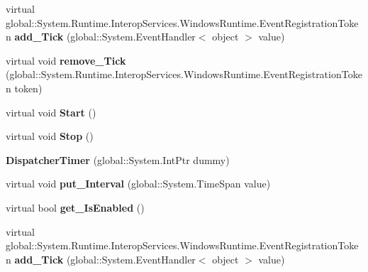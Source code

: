 \begin{DoxyCompactItemize}
\item 
\mbox{\label{class_windows_1_1_u_i_1_1_xaml_1_1_dispatcher_timer_afec18a9d2af7458ea713ce3d73bf8fc8}} 
virtual global\+::\+System.\+Runtime.\+Interop\+Services.\+Windows\+Runtime.\+Event\+Registration\+Token {\bfseries add\+\_\+\+Tick} (global\+::\+System.\+Event\+Handler$<$ object $>$ value)
\item 
\mbox{\label{class_windows_1_1_u_i_1_1_xaml_1_1_dispatcher_timer_a2dead21112a95b1c2d77308cd76f9917}} 
virtual void {\bfseries remove\+\_\+\+Tick} (global\+::\+System.\+Runtime.\+Interop\+Services.\+Windows\+Runtime.\+Event\+Registration\+Token token)
\item 
\mbox{\label{class_windows_1_1_u_i_1_1_xaml_1_1_dispatcher_timer_ace863a2c747bd7aa446b55fd38eaca7e}} 
virtual void {\bfseries Start} ()
\item 
\mbox{\label{class_windows_1_1_u_i_1_1_xaml_1_1_dispatcher_timer_a8465a583b290d1ba135b41f118bb7e91}} 
virtual void {\bfseries Stop} ()
\item 
\mbox{\label{class_windows_1_1_u_i_1_1_xaml_1_1_dispatcher_timer_a46c10638999c5f9db1a7102ce752b5e1}} 
{\bfseries Dispatcher\+Timer} (global\+::\+System.\+Int\+Ptr dummy)
\item 
\mbox{\label{class_windows_1_1_u_i_1_1_xaml_1_1_dispatcher_timer_a87fbb85d7540c9ede1de8c5586bab52b}} 
virtual void {\bfseries put\+\_\+\+Interval} (global\+::\+System.\+Time\+Span value)
\item 
\mbox{\label{class_windows_1_1_u_i_1_1_xaml_1_1_dispatcher_timer_aa01da6df2d38218542106e2b5024d1ad}} 
virtual bool {\bfseries get\+\_\+\+Is\+Enabled} ()
\item 
\mbox{\label{class_windows_1_1_u_i_1_1_xaml_1_1_dispatcher_timer_afec18a9d2af7458ea713ce3d73bf8fc8}} 
virtual global\+::\+System.\+Runtime.\+Interop\+Services.\+Windows\+Runtime.\+Event\+Registration\+Token {\bfseries add\+\_\+\+Tick} (global\+::\+System.\+Event\+Handler$<$ object $>$ value)

\end{DoxyCompactItemize}
